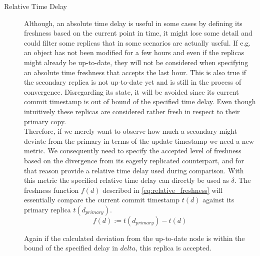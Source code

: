 \begin{description}
    \item [Relative Time Delay] 
    Although, an absolute time delay is useful in some cases by defining its freshness based on the current point in time, 
    it might lose some detail and could filter some replicas that in some scenarios are actually useful.
    If e.g. an object has not been modified for a few hours and even if the replicas might already be up-to-date, they will not be considered when specifying 
    an absolute time freshness that accepts the last hour.
    This is also true if the secondary replica is not up-to-date yet and is still in the process of convergence.
    Disregarding its state, it will be avoided since its current commit timestamp is out of bound of the specified time delay.
    Even though intuitively these replicas are considered rather fresh in respect to their primary copy.\\
    Therefore, if we merely want to observe how much a secondary might deviate from the primary in terms of the update timestamp we need a new metric.
    We consequently need to specify the accepted level of freshness based on the divergence from its eagerly replicated counterpart, 
    and for that reason provide a relative time delay used during comparison.
    With this metric the specified relative time delay can directly be used as $\delta$. The freshness function $f(d)$ described in \ref{eq:relative_freshness}
    will essentially compare the current commit timestamp $t(d)$ against its primary replica $t(d_{primary})$.
        \begin{equation} \label{eq:relative_freshness}
            f(d) := t(d_{primary}) - t(d)
        \end{equation}

    Again if the calculated deviation from the up-to-date node is within the bound of the specified delay in $delta$, this replica is accepted.




\end{description}
